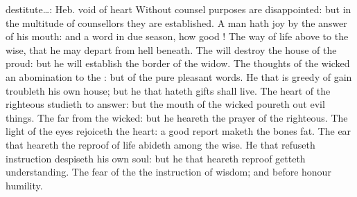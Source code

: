 {{destitute…: Heb. void of heart}
Without
counsel
purposes are
disappointed: but in the
multitude of
counsellors they are
established.
A
man hath
joy by the
answer of his
mouth: and a
word
{} in due
season, how
good
{}!
The
way of
life
{}
above to the
wise, that he may
depart from
hell
beneath.
The
{} will
destroy the
house of the
proud: but he will
establish the
border of the
widow.
The
thoughts of the
wicked
{} an
abomination to the
{}: but
{} of the
pure
{}
pleasant
words.
He that is
greedy of
gain
troubleth his own
house; but he that
hateth
gifts shall
live.
The
heart of the
righteous
studieth to
answer: but the
mouth of the
wicked
poureth out evil
things.
The
{}
{}
far from the
wicked: but he
heareth the
prayer of the
righteous.
The
light of the
eyes
rejoiceth the
heart:
{} a
good
report
maketh the
bones
fat.
The
ear that
heareth the
reproof of
life
abideth
among the
wise.
He that
refuseth
instruction
despiseth his own
soul: but he that
heareth
reproof
getteth
understanding.
The
fear of the
{}
{} the
instruction of
wisdom; and
before
honour
{}
humility.

}
